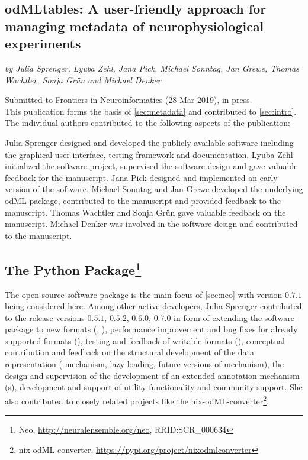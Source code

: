 \clearpage
\subsection*{odMLtables: A user-friendly approach for managing metadata of neurophysiological experiments}
\textit{by Julia Sprenger, Lyuba Zehl, Jana Pick, Michael Sonntag, Jan Grewe, Thomas Wachtler, Sonja Grün and Michael Denker}

Submitted to Frontiers in Neuroinformatics (28 Mar 2019), in press.\\

This publication forms the basis of \cref{sec:metadata} and contributed to \cref{sec:intro}. The individual authors contributed to the following aspects of the publication:

Julia Sprenger designed and developed the publicly available software including the graphical user interface, testing framework and documentation. Lyuba Zehl initialized the software project, supervised the software design and gave valuable feedback for the manuscript. Jana Pick designed and implemented an early version of the software. Michael Sonntag and Jan Grewe developed the underlying odML package, contributed to the manuscript and provided feedback to the manuscript. Thomas Wachtler and Sonja Grün gave valuable feedback on the manuscript. Michael Denker was involved in the software design and contributed to the manuscript.\\

\vspace{2cm}
\subsection*{The  Python Package\footnote{Neo, \url{http://neuralensemble.org/neo}, RRID:SCR\_000634}}
The open-source software package  \citep{Garcia_2014} is the main focus of \cref{sec:neo}  with version $0.7.1$ being considered here. Among other active  developers, Julia Sprenger contributed to the release versions $0.5.1$, $0.5.2$, $0.6.0$, $0.7.0$ in form of extending the software package to new formats (, ), performance improvement and bug fixes for already supported formats (), testing and feedback of writable formats (), conceptual contribution and feedback on the structural development of the data representation ( mechanism, lazy loading, future versions of  mechanism), the design and supervision of the development of an extended annotation mechanism (s), development and support of utility functionality and community support. She also contributed to closely related projects like the nix-odML-converter\footnote{nix-odML-converter, \url{https://pypi.org/project/nixodmlconverter}}.

